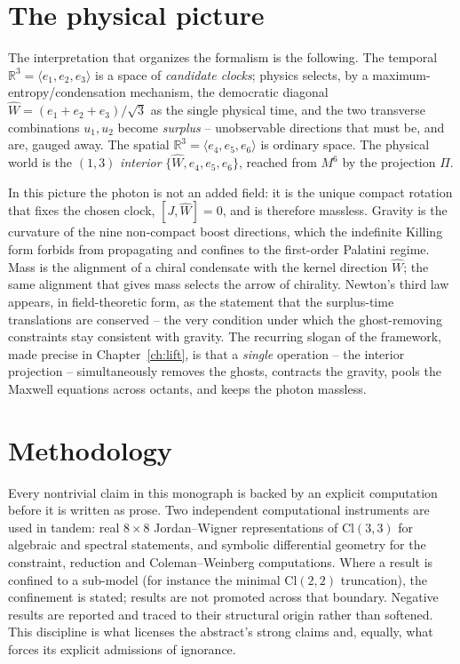\documentclass[11pt,oneside]{book}
\newcommand{\Wh}{\hat{W}}                         %
\newcommand{\Cl}{\mathrm{Cl}}                     %
\newcommand{\RR}{\mathbb{R}}
\theoremstyle{plain}
\theoremstyle{definition}
\theoremstyle{remark}
\begin{document}
\section{The physical picture}
\label{sec:picture}

The interpretation that organizes the formalism is the following. The temporal
$\RR^3=\langle e_1,e_2,e_3\rangle$ is a space of \emph{candidate clocks}; physics
selects, by a maximum-entropy/condensation mechanism, the democratic diagonal
$\Wh=(e_1+e_2+e_3)/\sqrt3$ as the single physical time, and the two transverse
combinations $u_1,u_2$ become \emph{surplus} -- unobservable directions that must
be, and are, gauged away. The spatial $\RR^3=\langle e_4,e_5,e_6\rangle$ is
ordinary space. The physical world is the $(1,3)$ \emph{interior}
$\{\Wh,e_4,e_5,e_6\}$, reached from $M^6$ by the projection $\Pi$.

In this picture the photon is not an added field: it is the unique compact rotation
that fixes the chosen clock, $[J,\Wh]=0$, and is therefore massless. Gravity is the
curvature of the nine non-compact boost directions, which the indefinite Killing
form forbids from propagating and confines to the first-order Palatini regime.
Mass is the alignment of a chiral condensate with the kernel direction $\Wh$;
the same alignment that gives mass selects the arrow of chirality. Newton's third
law appears, in field-theoretic form, as the statement that the surplus-time
translations are conserved -- the very condition under which the ghost-removing
constraints stay consistent with gravity. The recurring slogan of the framework,
made precise in Chapter~\ref{ch:lift}, is that a \emph{single} operation -- the
interior projection -- simultaneously removes the ghosts, contracts the gravity,
pools the Maxwell equations across octants, and keeps the photon massless.

\section{Methodology}
\label{sec:method}

Every nontrivial claim in this monograph is backed by an explicit computation
before it is written as prose. Two independent computational instruments are
used in tandem: real $8\times8$ Jordan--Wigner representations of $\Cl(3,3)$ for
algebraic and spectral statements, and symbolic differential geometry for the
constraint, reduction and Coleman--Weinberg computations. Where a result is
confined to a sub-model (for instance the minimal $\Cl(2,2)$ truncation), the
confinement is stated; results are not promoted across that boundary. Negative
results are reported and traced to their structural origin rather than softened.
This discipline is what licenses the abstract's strong claims and, equally, what
forces its explicit admissions of ignorance.
\end{document}
